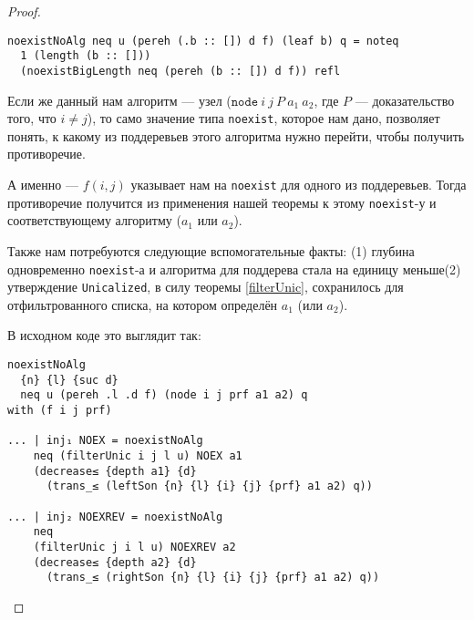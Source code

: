 \begin{proof}
\begin{enumerate}
{\footnotesize
\begin{verbatim}
noexistNoAlg neq u (pereh (.b :: []) d f) (leaf b) q = noteq
  1 (length (b :: []))
  (noexistBigLength neq (pereh (b :: []) d f)) refl
\end{verbatim}}

Если же данный нам алгоритм — узел ($\mathtt{node}\ i\ j\ P\ a_1\ a_2$, где $P$ — доказательство того, что $i \ne j$), то само значение типа {\tt noexist}, которое нам дано, позволяет понять, к какому из поддеревьев этого алгоритма нужно перейти, чтобы получить противоречие.

\ms А именно — $f(i,j)$ указывает нам на {\tt noexist} для одного из поддеревьев. Тогда противоречие получится из применения нашей теоремы к этому {\tt noexist}-у и соответствующему алгоритму ($a_1$ или $a_2$).

\ms Также нам потребуются следующие вспомогательные факты: (1) глубина одновременно {\tt noexist}-а и алгоритма для поддерева стала на единицу меньше\scolon (2) утверждение {\tt Unicalized}, в силу теоремы \ref{filterUnic}, сохранилось для отфильтрованного списка, на котором определён $a_1$ (или $a_2$).

\ms В исходном коде это выглядит так:

{\footnotesize
\begin{verbatim}
noexistNoAlg
  {n} {l} {suc d}
  neq u (pereh .l .d f) (node i j prf a1 a2) q
with (f i j prf)

... | inj₁ NOEX = noexistNoAlg
    neq (filterUnic i j l u) NOEX a1
    (decrease≤ {depth a1} {d}
      (trans_≤ (leftSon {n} {l} {i} {j} {prf} a1 a2) q))

... | inj₂ NOEXREV = noexistNoAlg
    neq
    (filterUnic j i l u) NOEXREV a2
    (decrease≤ {depth a2} {d}
      (trans_≤ (rightSon {n} {l} {i} {j} {prf} a1 a2) q))
\end{verbatim}}
\end{enumerate}
\end{proof}